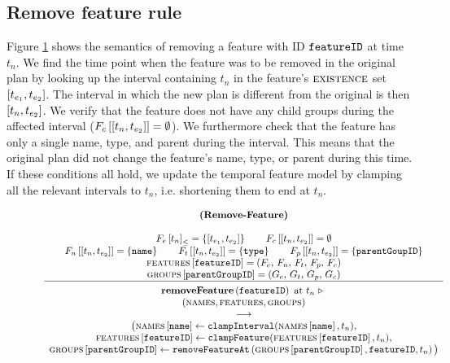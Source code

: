 \subsection{Remove feature rule}
Figure \ref{rule:remove-feature} shows the semantics of removing a feature with ID $\texttt{featureID}$ at time $t_n$. We find the time point when the feature was to be removed in the original plan by looking up the interval containing $t_n$ in the feature's $\textsc{existence}$ set $\interval{t_{e_1}}{t_{e_2}}$. The interval in which the new plan is different from the original is then $\interval{t_n}{t_{e_2}}$. We verify that the feature does not have any child groups during the affected interval ($\lookup{F_c}{\interval{t_{n}}{t_{e_2}}} = \emptyset$). We furthermore check that the feature has only a single name, type, and parent during the interval. This means that the original plan did not change the feature's name, type, or parent during this time. If these conditions all hold, we update the temporal feature model by clamping all the relevant intervals to $t_n$, i.e. shortening them to end at $t_n$. 

\begin{figure}
    \renewcommand{\arraystretch}{1.1}
    \sossize$$\begin{array}{c}
      \ntyperule{Remove-Feature}
      {\\
        \containing{F_e}{t_n} = \set{\interval{t_{e_1}}{t_{e_2}}} \qquad
        \lookup{F_c}{\interval{t_{n}}{t_{e_2}}} = \emptyset \\
        \lookup{F_n}{\interval{t_n}{t_{e_2}}} = \set{\var{name}} \qquad
        \lookup{F_t}{\interval{t_n}{t_{e_2}}} = \set{\var{type}} \qquad
        \lookup{F_p}{\interval{t_n}{t_{e_2}}} = \set{\var{parentGoupID}} \\
        \lookup{\features{}}{\var{featureID}} = \feature \\
        \lookup{\groups{}}{\var{parentGroupID}} = \group
      }
      {
        \textbf{removeFeature}\left( \var{featureID}\right) \text{ at } t_n \shove \\
        (\names{}, \features{}, \groups{}) \\
        \transition \\
        \big(\lookup{\names{}}{\var{name}} \assign \var{clampInterval}(\lookup{\names{}}{\var{name}}, t_n),\\
        \lookup{\features{}}{\var{featureID}} \assign \var{clampFeature}(\lookup{\features{}}{\var{featureID}}, t_n) ,\\
      \lookup{\groups{}}{\var{parentGroupID}} \assign \var{removeFeatureAt}\left(\lookup{\groups}{\var{parentGroupID}}, \var{featureID}, t_n\right)\big)
      }
    \end{array}$$
  \caption{\label{rule:remove-feature}}
\end{figure}


